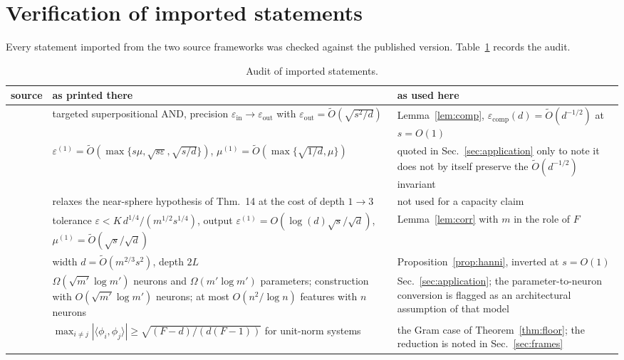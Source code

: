 \documentclass[preprint,12pt]{elsarticle}
\theoremstyle{definition}
\newcommand{\Otilde}{\widetilde{O}}
\newcommand{\ecomp}{\varepsilon_{\mathrm{comp}}}
\begin{document}
\section{Verification of imported statements}
\label{app:imported}

Every statement imported from the two source frameworks was checked against the published
version. Table~\ref{tab:imported} records the audit.

\begin{table}[h]
\centering
\caption{Audit of imported statements.}
\label{tab:imported}
\small
\begin{tabular}{p{3.1cm}p{4.6cm}p{4.6cm}}
\toprule
source & as printed there & as used here \\
\midrule
\cite[Thm.~11]{hanni2024superposition} &
targeted superpositional AND, precision $\varepsilon_{\mathrm{in}}\to\varepsilon_{\mathrm{out}}$
with $\varepsilon_{\mathrm{out}}=\Otilde(\sqrt{s^2/d})$ &
Lemma~\ref{lem:comp}, $\ecomp(d)=\Otilde(d^{-1/2})$ at $s=O(1)$ \\
\addlinespace[2pt]
\cite[Thm.~14]{hanni2024superposition} &
$\varepsilon^{(1)}=\Otilde(\max\{s\mu,\sqrt{s\varepsilon},\sqrt{s/d}\})$,
$\mu^{(1)}=\Otilde(\max\{\sqrt{1/d},\mu\})$ &
quoted in Sec.~\ref{sec:application} only to note it does not by itself preserve the
$\Otilde(d^{-1/2})$ invariant \\
\addlinespace[2pt]
\cite[Cor.~15]{hanni2024superposition} &
relaxes the near-sphere hypothesis of Thm.~14 at the cost of depth $1\to3$ &
not used for a capacity claim \\
\addlinespace[2pt]
\cite[Thm.~21]{hanni2024superposition} &
tolerance $\varepsilon<K\,d^{1/4}/(m^{1/2}s^{1/4})$, output
$\varepsilon^{(1)}=O(\log(d)\sqrt{s}/\sqrt d)$, $\mu^{(1)}=\Otilde(\sqrt s/\sqrt d)$ &
Lemma~\ref{lem:corr} with $m$ in the role of $F$ \\
\addlinespace[2pt]
\cite[Thm.~8]{hanni2024superposition} &
width $d=\Otilde(m^{2/3}s^2)$, depth $2L$ &
Proposition~\ref{prop:hanni}, inverted at $s=O(1)$ \\
\addlinespace[2pt]
\cite{adler2024superposition} &
$\Omega(\sqrt{m'}\log m')$ neurons and $\Omega(m'\log m')$ parameters; construction with
$O(\sqrt{m'}\log m')$ neurons; at most $O(n^2/\log n)$ features with $n$ neurons &
Sec.~\ref{sec:application}; the parameter-to-neuron conversion is flagged as an architectural
assumption of that model \\
\addlinespace[2pt]
\cite[Thm.~2.3]{strohmer2003grassmannian} &
$\max_{i\neq j}|\langle\phi_i,\phi_j\rangle|\ge\sqrt{(F-d)/(d(F-1))}$ for unit-norm systems &
the Gram case of Theorem~\ref{thm:floor}; the reduction is noted in Sec.~\ref{sec:frames} \\
\bottomrule
\end{tabular}
\end{table}
\end{document}
